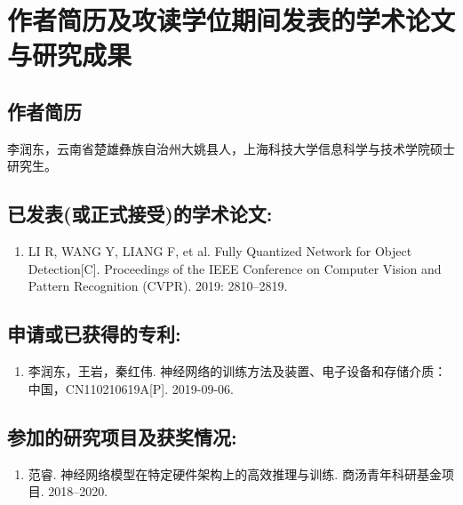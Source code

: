 \chapter{作者简历及攻读学位期间发表的学术论文与研究成果}

\section*{作者简历}
李润东，云南省楚雄彝族自治州大姚县人，上海科技大学信息科学与技术学院硕士研究生。

\section*{已发表(或正式接受)的学术论文:}
{
\setlist[enumerate]{}
\begin{enumerate}[nosep]
    \item LI R, WANG Y, LIANG F, et al. Fully Quantized Network for Object Detection[C]. Proceedings of the IEEE Conference on Computer Vision and Pattern Recognition (CVPR). 2019: 2810--2819.
\end{enumerate}
}

\section*{申请或已获得的专利:}
{
\setlist[enumerate]{}
\begin{enumerate}[nosep]
    \item 李润东，王岩，秦红伟. 神经网络的训练方法及装置、电子设备和存储介质：中国，CN110210619A[P]. 2019-09-06.
\end{enumerate}
}

\section*{参加的研究项目及获奖情况:}
{
\setlist[enumerate]{}
\begin{enumerate}[nosep]
    \item 范睿. 神经网络模型在特定硬件架构上的高效推理与训练. 商汤青年科研基金项目. 2018--2020.
\end{enumerate}
}

